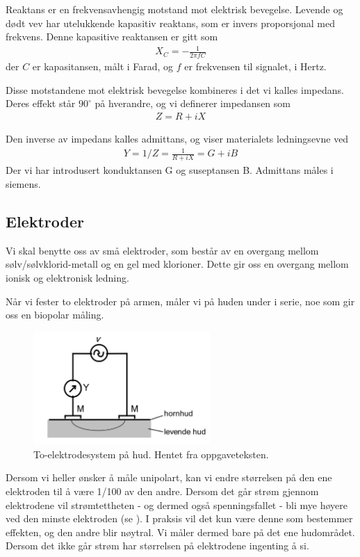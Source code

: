 \documentclass[11pt,norsk]{article}
\begin{document}
Reaktans er en frekvensavhengig motstand mot elektrisk bevegelse. Levende og dødt vev har utelukkende kapasitiv reaktans, som er invers proporsjonal med frekvens. Denne kapasitive reaktansen er gitt som
\begin{align}	X_C = -\frac{1}{2\pi f C}
\end{align}
der $C$ er kapasitansen, målt i Farad, og $f$ er frekvensen til signalet, i Hertz.

Disse motstandene mot elektrisk bevegelse kombineres i det vi kalles impedans. Deres effekt står $90^\circ$ på hverandre, og vi definerer impedansen som
\begin{align}	Z = R + iX
\end{align}

Den inverse av impedans kalles admittans, og viser materialets ledningsevne ved
\begin{align}	Y = 1/Z = \frac{1}{R + iX} = G + iB
\end{align}
Der vi har introdusert konduktansen G og suseptansen B. Admittans måles i siemens. 


\subsection{Elektroder}
Vi skal benytte oss av små elektroder, som består av en overgang mellom sølv/sølvklorid-metall og en gel med klorioner. Dette gir oss en overgang mellom ionisk og elektronisk ledning.

Når vi fester to elektroder på armen, måler vi på huden under i serie, noe som gir oss en biopolar måling. 

\begin{figure}[H]
\centering
\includegraphics[width = 0.6\textwidth]{fig/screenshot1.png}
\caption{To-elektrodesystem på hud. Hentet fra oppgaveteksten.}
\end{figure}

Dersom vi heller ønsker å måle unipolart, kan vi endre størrelsen på den ene elektroden til å være 1/100 av den andre. Dersom det går strøm gjennom elektrodene vil strømtettheten - og dermed også spenningsfallet - bli mye høyere ved den minste elektroden (se \cite[Grimnes og Martinsen, s.~39]{BioImp}). I praksis vil det kun være denne som bestemmer effekten, og den andre blir nøytral. Vi måler dermed bare på det ene hudområdet. Dersom det ikke går strøm har størrelsen på elektrodene ingenting å si.
\end{document}
